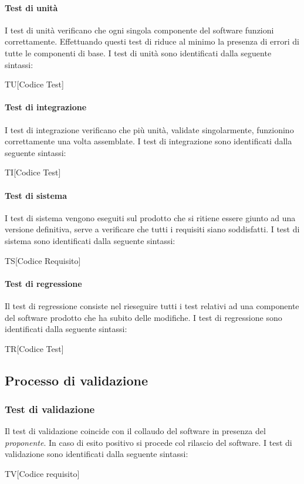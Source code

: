\paragraph{Test di unità}
I test di unità verificano che ogni singola componente del software funzioni
correttamente. Effettuando questi test di riduce al minimo la presenza di errori
di tutte le componenti di base. I test di unità sono identificati dalla seguente
sintassi:
\begin{center}
  TU[Codice Test]
\end{center}
\paragraph{Test di integrazione}
I test di integrazione verificano che più unità, validate singolarmente, funzionino
correttamente una volta assemblate. I test di integrazione sono identificati
dalla seguente sintassi:
\begin{center}
  TI[Codice Test]
\end{center}
\paragraph{Test di sistema}
I test di sistema vengono eseguiti sul prodotto che si ritiene essere giunto ad
una versione definitiva, serve a verificare che tutti i requisiti siano
soddisfatti. I test di sistema sono identificati dalla seguente sintassi:
\begin{center}
  TS[Codice Requisito]
\end{center}
\paragraph{Test di regressione}
Il test di regressione consiste nel rieseguire tutti i test relativi ad una
componente del software prodotto che ha subito delle modifiche. I test di
regressione sono identificati dalla seguente sintassi:
\begin{center}
  TR[Codice Test]
\end{center}

\subsection{Processo di validazione}
\subsubsection{Test di validazione}
Il test di validazione coincide con il collaudo del software in presenza del
\textit{proponente}. In caso di esito positivo si procede col rilascio del
software. I test di validazione sono identificati dalla seguente sintassi:
\begin{center}
	TV[Codice requisito]
\end{center}


